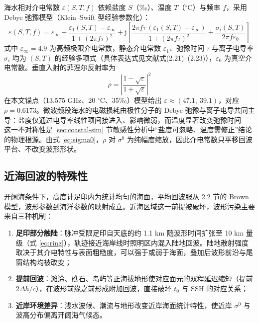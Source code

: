 \documentclass[a4paper]{article}
\begin{document}
海水相对介电常数 $\varepsilon(S, T, f)$ 依赖盐度 $S$（‰）、温度 $T$（$^\circ$C）与频率 $f$，采用 Debye 弛豫模型（Klein--Swift 型经验参数化\cite{refpaper}）：
\begin{equation}
	\varepsilon(S, T, f) = \varepsilon_\infty + \frac{\varepsilon_1(S, T) - \varepsilon_\infty}{1 + (2 \pi f \tau)^{2}} + \mathrm{j} \left[ \frac{2 \pi f \tau\, \left( \varepsilon_1(S, T) - \varepsilon_\infty \right)}{1 + (2 \pi f \tau)^{2}} + \frac{\sigma_i(S, T)}{2 \pi f \varepsilon_0} \right]
	\label{eq:debye}
\end{equation}
式中 $\varepsilon_\infty = 4.9$ 为高频极限介电常数，静态介电常数 $\varepsilon_1$、弛豫时间 $\tau$ 与离子电导率 $\sigma_i$ 均为 $(S, T)$ 的经验多项式（具体表达式见文献\cite{refpaper}式(2.21)--(2.23)），$\varepsilon_0$ 为真空介电常数。垂直入射的菲涅尔反射率为
\begin{equation}
	\rho = \left| \frac{1 - \sqrt{\varepsilon}}{1 + \sqrt{\varepsilon}} \right|^{2}
	\label{eq:fresnel}
\end{equation}
在本文锚点（13.575 GHz、20 $^\circ$C、35‰）模型给出 $\varepsilon \approx (47.1,\ 39.1)$，对应 $\rho = 0.6173$。微波频段海水的电磁损耗由极性分子的 Debye 弛豫与离子电导共同主导：盐度仅通过电导率线性项间接进入、影响微弱，而温度显著改变弛豫时间——这一不对称性是 \ref{sec:coastal-sim} 节敏感性分析中“盐度可忽略、温度需修正”结论的物理根源。由式 \eqref{eq:sigma0}，$\rho$ 对 $\sigma^0$ 为纯幅度缩放，因此介电常数只平移回波平台、不改变波形形状。

\subsection{近海回波的特殊性}
\label{sec:coastal-specific}

开阔海条件下，高度计足印内为统计均匀的海面，平均回波服从 2.2 节的 Brown 模型，波形参数到海洋参数的映射成立。近海区域这一前提被破坏，波形污染主要来自三种机制：
\begin{enumerate}
	\item \textbf{足印部分触陆}：脉冲受限足印自天底的约 1.1 km 随波形时间扩张至 10 km 量级（式 \eqref{eq:ring}），轨迹接近海岸线时照明区内混入陆地回波。陆地散射强度取决于其介电特性与表面粗糙度，可以强于或弱于海面，叠加后波形前沿与尾窗结构均被改变；
	\item \textbf{提前回波}：滩涂、礁石、岛屿等正海拔地形使对应面元的双程延迟缩短（提前 $2 \Delta h / c$），在波形前缘之前形成附加回波，直接破坏 $t_0$ 与 SSH 的对应关系；
	\item \textbf{近岸环境差异}：浅水波候、潮流与地形改变近岸海面统计特性，使近岸 $\sigma^0$ 与波高分布偏离开阔海气候态。
\end{enumerate}
\end{document}
